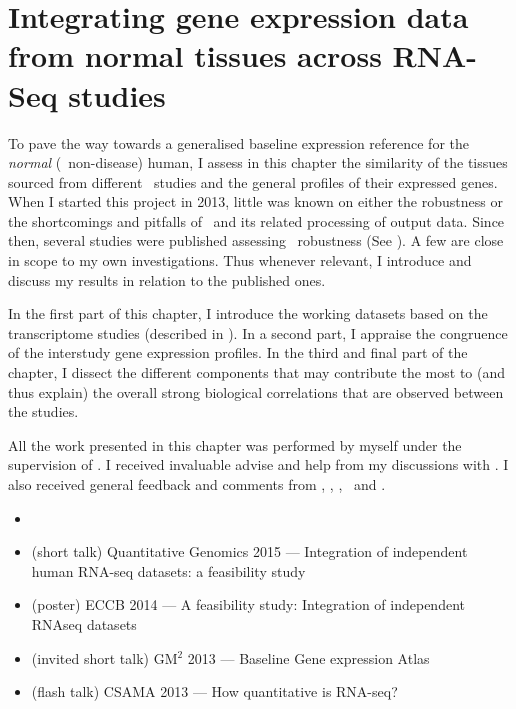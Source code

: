 \chapter{Integrating gene expression data from normal tissues across RNA-Seq studies}%
\label{ch:Transcriptomics}

\vspace*{0.7in}

To pave the way towards
a generalised baseline expression reference for the \emph{normal}
(\ie\ non-disease) human,
I assess in this chapter the similarity
of the tissues sourced from different \Rnaseq\ studies and
the general profiles of their expressed genes.
When I started this project in 2013,
little was known on either the robustness or
the shortcomings and pitfalls of \Rnaseq\ and
its related processing of output data.
Since then, several studies were published assessing \Rnaseq\
robustness (See ).
A few are close in scope to my own investigations.
Thus whenever relevant,
I introduce and discuss my results in relation to the published ones.

In the first part of this chapter,
I introduce the working datasets based on the transcriptome studies
(described in \Cref{ch:datasets}).
In a second part,
I appraise the congruence of the interstudy gene expression profiles.
In the third and final part of the chapter,
I dissect the different components that
may contribute the most to (and thus explain)
the overall strong biological correlations that are observed between the studies.

All the work presented in this chapter was performed by myself under the
supervision of \alvis.
I received invaluable advise and help from my discussions with \nuno.
I also received general feedback and comments from \mar, \johan, \sarah, \gos\
and \wolfgang.
\clearpage

\derivativeWork{}
\begin{itemize}[topsep=0pt,nosep]
    \item\hspace{-1.8mm}
    \item (short talk) Quantitative Genomics 2015 --- Integration of
        independent human RNA-seq datasets: a feasibility study
    \item (poster) ECCB 2014 --- A feasibility study:
        Integration of independent RNAseq datasets
    \item (invited short talk) GM$^2$ 2013 --- Baseline Gene expression Atlas
    \item (flash talk) CSAMA 2013 --- How quantitative is RNA-seq?
\end{itemize}
\clearpage


